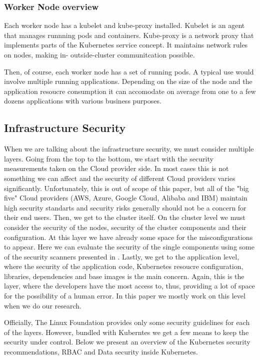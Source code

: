 \subsubsection*{Worker Node overview}

Each worker node has a kubelet and kube-proxy installed. Kubelet is an agent that manages runnning pods and containers. Kube-proxy is a network proxy that implements parts of the Kubernetes service concept. It maintains network rules on nodes, making in- outside-cluster communitcation possible.

Then, of course, each worker node has a set of running pods. A typical use would involve multiple running applications. Depending on the size of the node and the application resoucre consumption it can accomodate on average from one to a few dozens applications with various business purposes.

\subsection{Infrastructure Security}

When we are talking about the infrastructure security, we must consider multiple layers. Going from the top to the bottom, we start with the security measurements taken on the Cloud provider side. In most cases this is not something we can affect and the security of different Cloud providers varies significantly. Unfortunately, this is out of scope of this paper, but all of the "big five" Cloud providers (AWS, Azure, Google Cloud, Alibaba and IBM) maintain high security standarts and security risks generally should not be a concern for their end users. Then, we get to the cluster itself. On the cluster level we must consider the security of the nodes, security of the cluster components and their configuration. At this layer we have already some space for the misconfigurations to appear. Here we can evaluate the security of the single components using some of the security scanners presented in . Lastly, we get to the application level, where the security of the application code, Kubernetes resoucre configuration, libraries, dependencies and base images is the main concern. Again, this is the layer, where the developers have the most access to, thus, providing a lot of space for the possibility of a human error. In this paper we mostly work on this level when we do our research.

Officially, The Linux Foundation provides only some security guidelines for each of the layers. However, bundled with Kuberntes we get a few means to keep the security under control. Below we present an overview of the Kubernetes security recommendations, RBAC and Data security inside Kubernetes.


